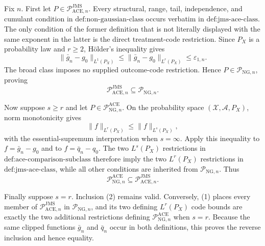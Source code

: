Fix \(n\).  First let \(P\in\mathcal P_{\mathrm{ACE},n}^{\mathrm{JMS}}\).  Every structural, range, tail, independence, and cumulant condition in \(\text{def:non-gaussian-class}\) occurs verbatim in \(\text{def:jms-ace-class}\).  The only condition of the former definition that is not literally displayed with the same exponent in the latter is the direct treatment-code restriction.  Since \(P_X\) is a probability law and \(r\ge2\), H\"older's inequality gives
\[
 \|\bar g_n-g_0\|_{L^1(P_X)}
 \le \|\bar g_n-g_0\|_{L^r(P_X)}
 \le \varepsilon_{1,n}.
\]
The broad class imposes no supplied outcome-code restriction.  Hence \(P\in\mathcal P_{\mathrm{NG},n}\), proving
\[
 \mathcal P_{\mathrm{ACE},n}^{\mathrm{JMS}}
 \subseteq\mathcal P_{\mathrm{NG},n}. \tag{1}
\]

Now suppose \(s\ge r\) and let \(P\in\mathcal P_{\mathrm{NG},n}^{\mathrm{ACE}}\).  On the probability space \((\mathcal X,\mathcal A,P_X)\), norm monotonicity gives
\[
 \|f\|_{L^r(P_X)}\le \|f\|_{L^s(P_X)},
\]
with the essential-supremum interpretation when \(s=\infty\).  Apply this inequality to \(f=\bar g_n-g_0\) and to \(f=\bar q_n-q_0\).  The two \(L^s(P_X)\) restrictions in \(\text{def:ace-comparison-subclass}\) therefore imply the two \(L^r(P_X)\) restrictions in \(\text{def:jms-ace-class}\), while all other conditions are inherited from \(\mathcal P_{\mathrm{NG},n}\).  Thus
\[
 \mathcal P_{\mathrm{NG},n}^{\mathrm{ACE}}
 \subseteq\mathcal P_{\mathrm{ACE},n}^{\mathrm{JMS}}. \tag{2}
\]

Finally suppose \(s=r\).  Inclusion (2) remains valid.  Conversely, (1) places every member of \(\mathcal P_{\mathrm{ACE},n}^{\mathrm{JMS}}\) in \(\mathcal P_{\mathrm{NG},n}\), and its two defining \(L^r(P_X)\) code bounds are exactly the two additional restrictions defining \(\mathcal P_{\mathrm{NG},n}^{\mathrm{ACE}}\) when \(s=r\).  Because the same clipped functions \(\bar g_n\) and \(\bar q_n\) occur in both definitions, this proves the reverse inclusion and hence equality.